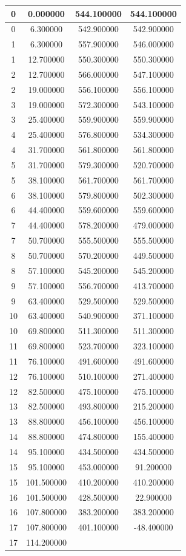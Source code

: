 \documentclass[a4paper,10pt]{article}
\begin{document}
\begin{enumerate}
\begin{center}
\begin{tabular}{|c|c|c|c|}
0 & 0.000000 & 544.100000 & 544.100000 \\ \hline 0 & 6.300000 & 542.900000 & 542.900000 \\ \hline 1 & 6.300000 & 557.900000 & 546.000000 \\ \hline 1 & 12.700000 & 550.300000 & 550.300000 \\ \hline 2 & 12.700000 & 566.000000 & 547.100000 \\ \hline 2 & 19.000000 & 556.100000 & 556.100000 \\ \hline 3 & 19.000000 & 572.300000 & 543.100000 \\ \hline 3 & 25.400000 & 559.900000 & 559.900000 \\ \hline 4 & 25.400000 & 576.800000 & 534.300000 \\ \hline 4 & 31.700000 & 561.800000 & 561.800000 \\ \hline 5 & 31.700000 & 579.300000 & 520.700000 \\ \hline 5 & 38.100000 & 561.700000 & 561.700000 \\ \hline 6 & 38.100000 & 579.800000 & 502.300000 \\ \hline 6 & 44.400000 & 559.600000 & 559.600000 \\ \hline 7 & 44.400000 & 578.200000 & 479.000000 \\ \hline 7 & 50.700000 & 555.500000 & 555.500000 \\ \hline 8 & 50.700000 & 570.200000 & 449.500000 \\ \hline 8 & 57.100000 & 545.200000 & 545.200000 \\ \hline 9 & 57.100000 & 556.700000 & 413.700000 \\ \hline 9 & 63.400000 & 529.500000 & 529.500000 \\ \hline 10 & 63.400000 & 540.900000 & 371.100000 \\ \hline 10 & 69.800000 & 511.300000 & 511.300000 \\ \hline 11 & 69.800000 & 523.700000 & 323.100000 \\ \hline 11 & 76.100000 & 491.600000 & 491.600000 \\ \hline 12 & 76.100000 & 510.100000 & 271.400000 \\ \hline 12 & 82.500000 & 475.100000 & 475.100000 \\ \hline 13 & 82.500000 & 493.800000 & 215.200000 \\ \hline 13 & 88.800000 & 456.100000 & 456.100000 \\ \hline 14 & 88.800000 & 474.800000 & 155.400000 \\ \hline 14 & 95.100000 & 434.500000 & 434.500000 \\ \hline 15 & 95.100000 & 453.000000 & 91.200000 \\ \hline 15 & 101.500000 & 410.200000 & 410.200000 \\ \hline 16 & 101.500000 & 428.500000 & 22.900000 \\ \hline 16 & 107.800000 & 383.200000 & 383.200000 \\ \hline 17 & 107.800000 & 401.100000 & -48.400000 \\ \hline 17 & 114.200000 & 
\end{tabular}
\end{center}
\end{enumerate}
\end{document}
